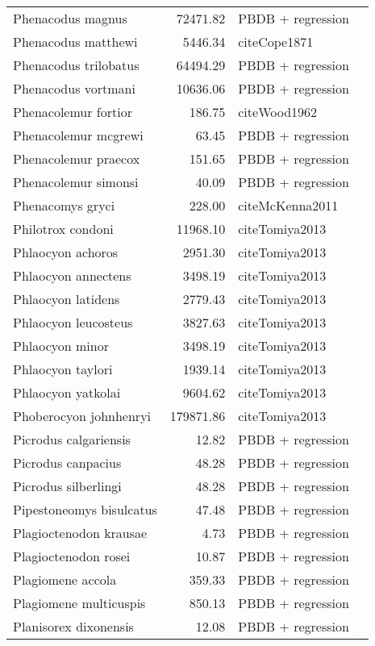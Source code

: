 \begin{table}[ht]
\begin{tabular}{lrll}
  Phenacodus magnus & 72471.82 & PBDB + regression &  \\ 
  Phenacodus matthewi & 5446.34 & cite{Cope1871} &  \\ 
  Phenacodus trilobatus & 64494.29 & PBDB + regression &  \\ 
  Phenacodus vortmani & 10636.06 & PBDB + regression &  \\ 
  Phenacolemur fortior & 186.75 & cite{Wood1962} &  \\ 
  Phenacolemur mcgrewi & 63.45 & PBDB + regression &  \\ 
  Phenacolemur praecox & 151.65 & PBDB + regression &  \\ 
  Phenacolemur simonsi & 40.09 & PBDB + regression &  \\ 
  Phenacomys gryci & 228.00 & cite{McKenna2011} &  \\ 
  Philotrox condoni & 11968.10 & cite{Tomiya2013} &  \\ 
  Phlaocyon achoros & 2951.30 & cite{Tomiya2013} &  \\ 
  Phlaocyon annectens & 3498.19 & cite{Tomiya2013} &  \\ 
  Phlaocyon latidens & 2779.43 & cite{Tomiya2013} &  \\ 
  Phlaocyon leucosteus & 3827.63 & cite{Tomiya2013} &  \\ 
  Phlaocyon minor & 3498.19 & cite{Tomiya2013} &  \\ 
  Phlaocyon taylori & 1939.14 & cite{Tomiya2013} &  \\ 
  Phlaocyon yatkolai & 9604.62 & cite{Tomiya2013} &  \\ 
  Phoberocyon johnhenryi & 179871.86 & cite{Tomiya2013} &  \\ 
  Picrodus calgariensis & 12.82 & PBDB + regression &  \\ 
  Picrodus canpacius & 48.28 & PBDB + regression &  \\ 
  Picrodus silberlingi & 48.28 & PBDB + regression &  \\ 
  Pipestoneomys bisulcatus & 47.48 & PBDB + regression &  \\ 
  Plagioctenodon krausae & 4.73 & PBDB + regression &  \\ 
  Plagioctenodon rosei & 10.87 & PBDB + regression &  \\ 
  Plagiomene accola & 359.33 & PBDB + regression &  \\ 
  Plagiomene multicuspis & 850.13 & PBDB + regression &  \\ 
  Planisorex dixonensis & 12.08 & PBDB + regression &  \\ 

\end{tabular}
\end{table}
